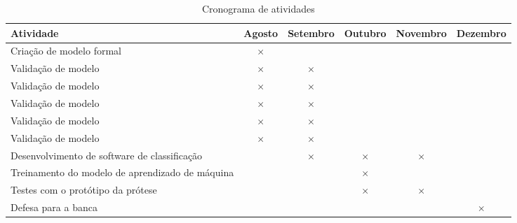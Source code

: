 \label{chapter:consideracoes}

\begin{table}[htbp]
  \centering
  \caption{Cronograma de atividades}
  \label{tab:cronograma}
  \begin{tabularx}{\textwidth}{|X|c|c|c|c|c|}
    \hline
    \textbf{Atividade} & \textbf{Agosto} & \textbf{Setembro} & \textbf{Outubro} & \textbf{Novembro} & \textbf{Dezembro} \\
    \hline
    Criação de modelo formal & \(\times\) & & & & \\
    \hline
    Validação de modelo & \(\times\) & \(\times\)  &  & & \\
    \hline
    Validação de modelo & \(\times\) & \(\times\)  &  & & \\
    \hline
    Validação de modelo & \(\times\) & \(\times\)  &  & & \\
    \hline
    Validação de modelo & \(\times\) & \(\times\)  &  & & \\
   \hline
    Validação de modelo & \(\times\) & \(\times\)  &  & & \\    
    \hline
    Desenvolvimento de software de classificação & & \(\times\) & \(\times\) & \(\times\) & \\
    \hline
    Treinamento do modelo de aprendizado de máquina & & & \(\times\) & &  \\
    \hline
    Testes com o protótipo da prótese & & & \(\times\) & \(\times\) &  \\
    \hline
    Defesa para a banca & & & & & \(\times\)  \\
    \hline
  \end{tabularx}
\end{table}